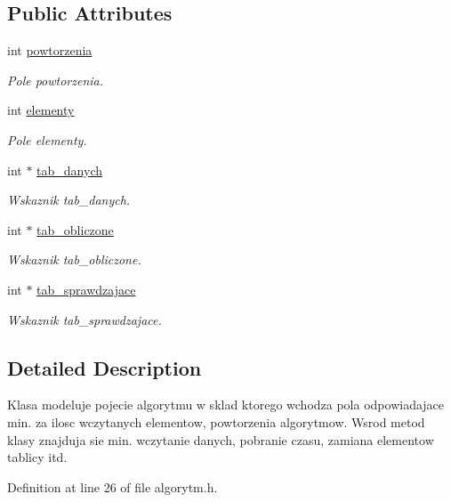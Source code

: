 \subsection*{Public Attributes}
\begin{DoxyCompactItemize}
\item 
int \hyperlink{classalgorytm_a6f208bf8705cfe407a3b7dea8b1e871c}{powtorzenia}
\begin{DoxyCompactList}\small\item\em Pole powtorzenia. \end{DoxyCompactList}\item 
int \hyperlink{classalgorytm_aa8284a41958410778215e08dc305f409}{elementy}
\begin{DoxyCompactList}\small\item\em Pole elementy. \end{DoxyCompactList}\item 
int $\ast$ \hyperlink{classalgorytm_a7bbde139599763bf8b36d21c6f314a1a}{tab\-\_\-danych}
\begin{DoxyCompactList}\small\item\em Wskaznik tab\-\_\-danych. \end{DoxyCompactList}\item 
int $\ast$ \hyperlink{classalgorytm_a02dd561c7411091f78e0d058bb1485df}{tab\-\_\-obliczone}
\begin{DoxyCompactList}\small\item\em Wskaznik tab\-\_\-obliczone. \end{DoxyCompactList}\item 
int $\ast$ \hyperlink{classalgorytm_a67ec91f63071c85dea86bed4b77d5239}{tab\-\_\-sprawdzajace}
\begin{DoxyCompactList}\small\item\em Wskaznik tab\-\_\-sprawdzajace. \end{DoxyCompactList}\end{DoxyCompactItemize}


\subsection{Detailed Description}
Klasa modeluje pojecie algorytmu w sklad ktorego wchodza pola odpowiadajace min. za ilosc wczytanych elementow, powtorzenia algorytmow. Wsrod metod klasy znajduja sie min. wczytanie danych, pobranie czasu, zamiana elementow tablicy itd. 

Definition at line 26 of file algorytm.\-h.



